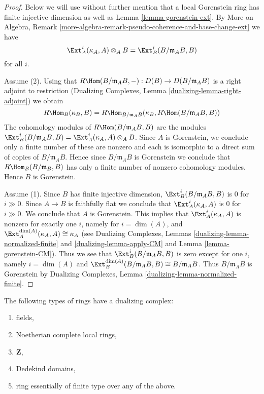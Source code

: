 \begin{proof}
Below we will use without further mention that a local Gorenstein ring
has finite injective dimension as well as Lemma \ref{lemma-gorenstein-ext}.
By More on Algebra, Remark
\ref{more-algebra-remark-pseudo-coherence-and-base-change-ext}
we have
$$
\Ext^i_A(\kappa_A, A) \otimes_A B =
\Ext^i_B(B/\mathfrak m_A B, B)
$$
for all $i$.

\medskip\noindent
Assume (2). Using that
$R\Hom(B/\mathfrak m_A B, -) : D(B) \to D(B/\mathfrak m_A B)$ is a
right adjoint to restriction
(Dualizing Complexes, Lemma \ref{dualizing-lemma-right-adjoint}) we obtain
$$
R\Hom_B(\kappa_B, B) =
R\Hom_{B/\mathfrak m_A B}(\kappa_B, R\Hom(B/\mathfrak m_A B, B))
$$
The cohomology modules of $R\Hom(B/\mathfrak m_A B, B)$ are the modules
$\Ext^i_B(B/\mathfrak m_A B, B) =
\Ext^i_A(\kappa_A, A) \otimes_A B$.
Since $A$ is Gorenstein, we conclude only a finite number of these are nonzero
and each is isomorphic to a direct sum of copies of $B/\mathfrak m_A B$.
Hence since $B/\mathfrak m_A B$ is Gorenstein we conclude that
$R\Hom_B(B/\mathfrak m_B, B)$ has only a finite number of nonzero
cohomology modules. Hence $B$ is Gorenstein.

\medskip\noindent
Assume (1). Since $B$ has finite injective dimension,
$\Ext^i_B(B/\mathfrak m_A B, B)$ is $0$ for $i \gg 0$.
Since $A \to B$ is faithfully flat
we conclude that $\Ext^i_A(\kappa_A, A)$ is $0$
for $i \gg 0$. We conclude that $A$ is Gorenstein. This implies that
$\Ext^i_A(\kappa_A, A)$ is nonzero for exactly one $i$,
namely for $i = \dim(A)$, and
$\Ext^{\dim(A)}_A(\kappa_A, A) \cong \kappa_A$
(see Dualizing Complexes, Lemmas \ref{dualizing-lemma-normalized-finite}
and \ref{dualizing-lemma-apply-CM} and Lemma \ref{lemma-gorenstein-CM}).
Thus we see that
$\Ext^i_B(B/\mathfrak m_A B, B)$ is zero except for one $i$,
namely $i = \dim(A)$ and
$\Ext^{\dim(A)}_B(B/\mathfrak m_A B, B) \cong B/\mathfrak m_A B$.
Thus $B/\mathfrak m_A B$ is Gorenstein by
Dualizing Complexes, Lemma \ref{dualizing-lemma-normalized-finite}.
\end{proof}

\begin{lemma}
\label{lemma-ubiquity-dualizing}
The following types of rings have a dualizing complex:
\begin{enumerate}
\item fields,
\item Noetherian complete local rings,
\item $\mathbf{Z}$,
\item Dedekind domains,
\item ring essentially of finite type over any of the above.
\end{enumerate}
\end{lemma}

